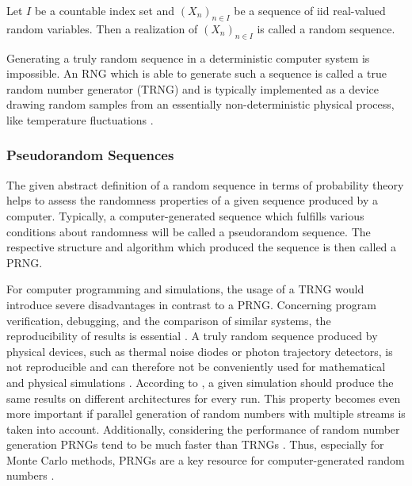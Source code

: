 \documentclass{stdlocal}
\begin{document}
    \begin{definition}
      Let $I$ be a countable index set and $(X_n)_{n\in I}$ be a sequence of iid real-valued random variables.
      Then a realization of $(X_n)_{n\in I}$ is called a random sequence.
    \end{definition}

    Generating a truly random sequence in a deterministic computer system is impossible.
    An RNG which is able to generate such a sequence is called a true random number generator (TRNG) and is typically implemented as a device drawing random samples from an essentially non-deterministic physical process, like temperature fluctuations \autocite{intel-drng}.

    \subsubsection*{Pseudorandom Sequences}
    The given abstract definition of a random sequence in terms of probability theory helps to assess the randomness properties of a given sequence produced by a computer.
    Typically, a computer-generated sequence which fulfills various conditions about randomness will be called a pseudorandom sequence.
    The respective structure and algorithm which produced the sequence is then called a PRNG.

    For computer programming and simulations, the usage of a TRNG would introduce severe disadvantages in contrast to a PRNG.
    Concerning program verification, debugging, and the comparison of similar systems, the reproducibility of results is essential \autocite{lecuyer2015}.
    A truly random sequence produced by physical devices, such as thermal noise diodes or photon trajectory detectors, is not reproducible and can therefore not be conveniently used for mathematical and physical simulations \autocite{lecuyer2015}.
    According to \textcite{lecuyer2015}, a given simulation should produce the same results on different architectures for every run.
    This property becomes even more important if parallel generation of random numbers with multiple streams is taken into account.
    Additionally, considering the performance of random number generation PRNGs tend to be much faster than TRNGs \autocite{intel-drng}.
    Thus, especially for Monte Carlo methods, PRNGs are a key resource for computer-generated random numbers \autocite{bauke2007}.
\end{document}
